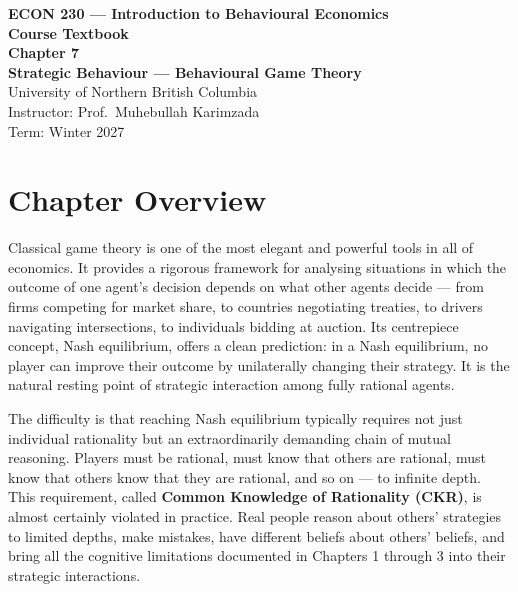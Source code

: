 \documentclass[12pt, letterpaper]{article}
\begin{document}
\begin{titlepage}
\centering\vspace*{3cm}
{\Large\bfseries\color{econblue} ECON 230 --- Introduction to Behavioural Economics\\[1em]}
{\large\bfseries Course Textbook\\[2em]}
{\LARGE\bfseries\color{econblue} Chapter 7\\[0.5em]}
{\Large\bfseries Strategic Behaviour --- Behavioural Game Theory\\[2em]}
\vfill
{\normalsize University of Northern British Columbia\\
Instructor: Prof.\ Muhebullah Karimzada\\
Term: Winter 2027}
\end{titlepage}
\tableofcontents
\newpage





\section*{Chapter Overview}


Classical game theory is one of the most elegant and powerful tools in all of economics. It provides a rigorous framework for analysing situations in which the outcome of one agent's decision depends on what other agents decide --- from firms competing for market share, to countries negotiating treaties, to drivers navigating intersections, to individuals bidding at auction. Its centrepiece concept, Nash equilibrium, offers a clean prediction: in a Nash equilibrium, no player can improve their outcome by unilaterally changing their strategy. It is the natural resting point of strategic interaction among fully rational agents.

The difficulty is that reaching Nash equilibrium typically requires not just individual rationality but an extraordinarily demanding chain of mutual reasoning. Players must be rational, must know that others are rational, must know that others know that they are rational, and so on --- to infinite depth. This requirement, called \textbf{Common Knowledge of Rationality (CKR)}, is almost certainly violated in practice. Real people reason about others' strategies to limited depths, make mistakes, have different beliefs about others' beliefs, and bring all the cognitive limitations documented in Chapters 1 through 3 into their strategic interactions.
\end{document}
